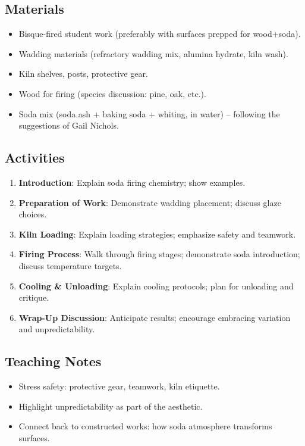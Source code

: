 \documentclass[12pt]{scrartcl}
\begin{document}
\subsection*{Materials}
\begin{itemize}
  \item Bisque-fired student work (preferably with  surfaces prepped for wood+soda).
  \item Wadding materials (refractory wadding mix, alumina hydrate, kiln wash).
  \item Kiln shelves, posts, protective gear.
  \item Wood for firing (species discussion: pine, oak, etc.).
  \item Soda mix (soda ash + baking soda + whiting, in water) -- following the suggestions of Gail Nichols.
\end{itemize}

\subsection*{Activities}
\begin{enumerate}
  \item \textbf{Introduction}: Explain soda firing chemistry; show examples.
  \item \textbf{Preparation of Work}: Demonstrate wadding placement; discuss glaze choices.
  \item \textbf{Kiln Loading}: Explain loading strategies; emphasize safety and teamwork.
  \item \textbf{Firing Process}: Walk through firing stages; demonstrate soda introduction; discuss temperature targets.
  \item \textbf{Cooling \& Unloading}: Explain cooling protocols; plan for unloading and critique.
  \item \textbf{Wrap-Up Discussion}: Anticipate results; encourage embracing variation and unpredictability.
\end{enumerate}

\subsection*{Teaching Notes}
\begin{itemize}
  \item Stress safety: protective gear, teamwork, kiln etiquette.
  \item Highlight unpredictability as part of the aesthetic.
  \item Connect back to constructed works: how soda atmosphere transforms surfaces.
\end{itemize}
\end{document}
